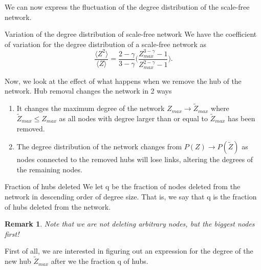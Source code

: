 \documentclass[twoside]{article}
\newtheorem{remark}[theorem]{Remark}
\begin{document}
We can now express the fluctuation of the degree distribution of the scale-free network.

\begin{definition_exam}{Variation of the degree distribution of scale-free network}{}
We have the coefficient of variation for the degree distribution of a scale-free network as
$$
\frac{\langle Z^2 \rangle}{\langle Z \rangle} = \frac{2 - \gamma}{3 - \gamma}\bigg(\frac{Z_{max}^{3 - \gamma} - 1}{Z_{max}^{2 - \gamma} - 1} \bigg).
$$
\end{definition_exam}

Now, we look at the effect of what happens when we remove the hub of the network. Hub removal changes the network in 2 ways 
\begin{enumerate}
\item It changes the maximum degree of the network $Z_{max} \rightarrow \tilde{Z}_{max}$ where $\tilde{Z}_{max} \leq Z_{max}$ as all nodes with degree larger than or equal to $\tilde{Z}_{max}$ has been removed. 
\item The degree distribution of the network changes from $P(Z) \rightarrow P(\tilde{Z})$ as nodes connected to the removed hubs will lose links, altering the degrees of the remaining nodes.
\end{enumerate}


\begin{definition_exam}{Fraction of hubs deleted}{} We let q be the fraction of nodes deleted from the network in descending order of degree size. That is, we say that q is the fraction of hubs deleted from the network.
\end{definition_exam}
\begin{remark} Note that we are not deleting arbitrary nodes, but the biggest nodes first!
\end{remark}

First of all, we are interested in figuring out an expression for the degree of the new hub $\tilde{Z}_{max}$ after we the fraction q of hubs.
\end{document}
